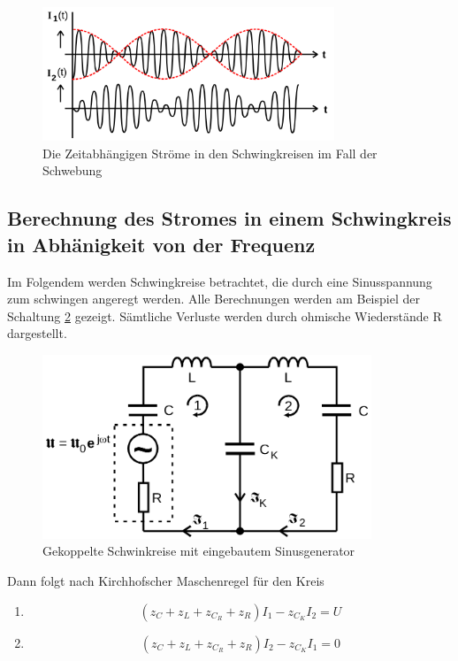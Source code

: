 \begin{figure}
    \centering
    \includegraphics[height = 4cm]{./logos/Abb3.png}
    \caption{Die Zeitabhängigen Ströme in den Schwingkreisen im Fall der Schwebung\cite{sample}}
    \label{fig:Abb3}
\end{figure}
\FloatBarrier
  \subsection{Berechnung des Stromes in einem Schwingkreis in Abhänigkeit von der Frequenz}
  Im Folgendem werden Schwingkreise betrachtet, die durch eine Sinusspannung zum schwingen angeregt werden. Alle Berechnungen werden am Beispiel der Schaltung \ref{fig:Abb4} gezeigt.
  Sämtliche Verluste werden durch ohmische Wiederstände R dargestellt.
  \begin{figure}
    \centering
    \includegraphics[height= 5.5cm]{./logos/Abb4.png}
    \caption{Gekoppelte Schwinkreise mit eingebautem Sinusgenerator\cite{sample}}
    \label{fig:Abb4}
  \end{figure}
  Dann folgt nach Kirchhofscher Maschenregel  für den Kreis
  \begin{enumerate}
    \item
    \begin{equation}
        (z_C + z_L + z_{C_R} + z_R)I_1 - z_{C_K} I_2 = U
        \label{eqn:U1}
    \end{equation}
      \item
      \begin{equation}
          (z_C + z_L + z_{C_R} + z_R)I_2 - z_{C_K} I_1 = 0
          \label{eqn:U2}
      \end{equation}

  \end{enumerate}
